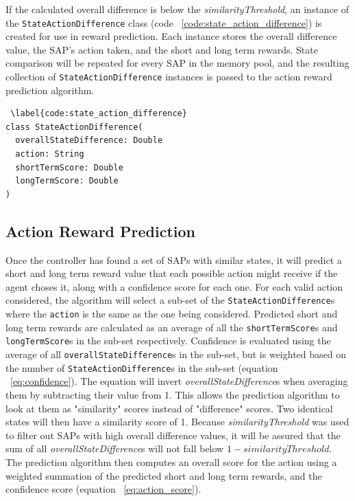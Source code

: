 If the calculated overall difference is below the \textit{similarityThreshold}, an instance of the \texttt{StateActionDifference} class (code ~\ref{code:state_action_difference}) is created for use in reward prediction.
Each instance stores the overall difference value, the SAP's action taken, and the short and long term rewards.
State comparison will be repeated for every SAP in the memory pool, and the resulting collection of \texttt{StateActionDifference} instances is passed to the action reward prediction algorithm.

\begin{lstlisting} \label{code:state_action_difference}
class StateActionDifference(
  overallStateDifference: Double
  action: String
  shortTermScore: Double
  longTermScore: Double
)
\end{lstlisting}


\subsection{Action Reward Prediction}
Once the controller has found a set of SAPs with similar states, it will predict a short and long term reward value that each possible action might receive if the agent choses it, along with a confidence score for each one.
For each valid action considered, the algorithm will select a sub-set of the \texttt{StateActionDifference}s where the \texttt{action} is the same as the one being considered.
Predicted short and long term rewards are calculated as an average of all the \texttt{shortTermScore}s and \texttt{longTermScore}s in the sub-set respectively.
Confidence is evaluated using the average of all \texttt{overallStateDifference}s in the sub-set, but is weighted based on the number of \texttt{StateActionDifference}s in the sub-set (equation ~\ref{eq:confidence}).
The equation will invert \textit{overallStateDifference}s when averaging them by subtracting their value from 1.
This allows the prediction algorithm to look at them as "similarity" scores instead of "difference" scores.
Two identical states will then have a similarity score of 1.
Because \textit{similarityThreshold} was used to filter out SAPs with high overall difference values, it will be assured that the sum of all \textit{overallStateDifference}s will not fall below $1 - similarityThreshold$.
The prediction algorithm then computes an overall score for the action using a weighted summation of the predicted short and long term rewards, and the confidence score (equation ~\ref{eq:action_score}).

